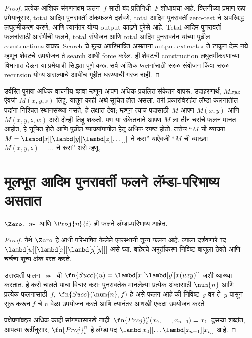 \begin{proof}

प्रत्येक आंशिक संगणनक्षम फलन~$f$ साठी बंद प्रतिनिधी~$F$
शोधायचा आहे. क्लिनीच्या प्रमाण रूप प्रमेयानुसार, total आदिम
पुनरावर्ती अंकफलने दर्शवणे, total आदिम पुनरावर्ती zero-test
चे अपरिबद्ध लघुतमीकरण करणे, आणि त्यानंतर योग्य output
काढणे पुरेसे आहे. Total आदिम पुनरावर्ती फलनांसाठी आरंभीची
फलने, total संयोजन आणि total आदिम पुनरावर्तन यांच्या पुढील
constructions वापरू. Search चे मूल्य अपरिभाषित असताना
output extractor ते टाकून देऊ नये म्हणून शेवटचे उपयोजन
ते search आधी force करेल. ही शेवटची construction
लघुतमीकरणाच्या विभागात देऊन या प्रमेयाची सिद्धता पूर्ण करू.
सर्व आंशिक फलनांसाठी सरळ संयोजन किंवा सरळ recursion
योग्य असल्याचे आधीच गृहीत धरण्याची गरज नाही.
\end{proof}

उर्वरित पुरावा अधिक वाचनीय व्हावा म्हणून आपण अधिक प्रचलित
संकेतन वापरू. उदाहरणार्थ, $Mxyz$ ऐवजी $M(x, y, z)$ लिहू.
यातून काही अर्थ सूचित होत असला, तरी प्रकारविरहित लॅम्डा
कलनातील पदांना निश्चित स्थानसंख्या नसते, हे लक्षात ठेवा;
म्हणून त्याच पदासाठी~$M$ आपण $M(x,y)$ आणि
$M(x,y,z,w)$ असे दोन्ही लिहू शकतो. पण या संकेतनाने
आपण $M$ ला तीन चरांचे फलन मानत आहोत, हे सूचित होते
आणि पुढील व्याख्यांमागील हेतू अधिक स्पष्ट होतो.
तसेच “$M$ ची व्याख्या $M =
\lambd[x][\lambd[y][\lambd[z][\dots]]]$ ने करा”
याऐवजी “$M$ ची व्याख्या $M(x,y,z) = \dots$ ने करा”
असे म्हणू.











\section{मूलभूत आदिम पुनरावर्ती फलने लॅम्डा-परिभाष्य असतात}\label{lam:int:bas:sec}

\begin{lem}
$\Zero$, $\Succ$ आणि $\Proj{n}{i}$ ही फलने
लॅम्डा-परिभाष्य आहेत.
\end{lem}

\begin{proof}

येथे $\Zero$ हे आधी परिभाषित केलेले एकस्थानी शून्य फलन आहे.
त्याला दर्शवणारे पद
$\lambd[w][\lambd[x][\lambd[y][y]]]$
असे घ्या. बाहेरचे अमूर्तीकरण निविष्ट बाजूला ठेवते आणि
चर्चचा शून्य अंक परत करते.

उत्तरवर्ती फलन~$\Succ$ ची
$\fn{Succ}(u) = \lambd[x][\lambd[y][x(uxy)]]$ अशी
व्याख्या करतात. हे कसे चालते याचा विचार करा: पुनरावर्तक
मानलेल्या प्रत्येक अंकासाठी $\num{n}$ आणि प्रत्येक
फलनासाठी~$f$, $\fn{Succ}(\num{n},f)$ हे असे फलन आहे
की निविष्ट~$y$ वर ते~$y$ पासून सुरू करून $f$ चे $n$
वेळा उपयोजन करते आणि त्यानंतर आणखी एकदा उपयोजन करते.

प्रक्षेपणांबद्दल अधिक काही सांगण्यासारखे नाही:
$\fn{Proj}^n_i(x_0, \dots,
x_{n-1}) = x_i$. दुसऱ्या शब्दांत, आपल्या रूढींनुसार,
$\fn{Proj}^n_i$ हे लॅम्डा पद
$\lambd[x_0][\dots \lambd[x_{n-1}][x_i]]$ आहे.
\end{proof}











